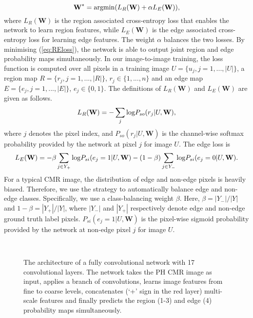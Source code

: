 \documentclass[runningheads,a4paper]{llncs}
\begin{document}
\begin{equation} \label{eq:REloss}
\textbf{W}^* = {\rm{argmin}} (L_R(\textbf{W}) + \alpha L_E(\textbf{W}) ),
\end{equation}
where $L_R(\textbf{W})$ is the region associated cross-entropy loss that enables the network to learn region features, while $L_E(\textbf{W})$ is the edge associated cross-entropy loss for learning edge features. The weight $\alpha$ balances the two losses. By minimising (\ref{eq:REloss}), the network is able to output joint region and edge probability maps simultaneously. In our image-to-image training, the loss function is computed over all pixels in a training image $U=\{u_j,j=1,...,|U|\}$, a region map $R=\{r_j,j=1,...,|R|\}$, $r_j \in \{1,...,n\}$ and an edge map $E=\{e_j,j=1,...,|E|\}$, $e_j \in \{0,1\}$. The definitions of $L_R(\textbf{W})$ and $L_E(\textbf{W})$ are given as follows.
\begin{equation} \label{eq:Rloss}
L_R(\textbf{W}) = -\sum\limits_{j}{\rm{log}}P_{so}(r_j|U,\textbf{W}),
\end{equation} 
where $j$ denotes the pixel index, and $P_{so}(r_j|U,\textbf{W})$ is the channel-wise softmax probability provided by the network at pixel $j$ for image $U$. The edge loss is 
\begin{equation} \label{eq:Eloss}
L_E(\textbf{W}) = -\beta\sum\limits_{j \in Y_+}{\rm{log}} P_{si}(e_j=1|U,\textbf{W}) - (1-\beta)\sum\limits_{j \in Y_-}{\rm{log}}P_{si}(e_j=0|U,\textbf{W}).
\end{equation}
For a typical CMR image, the distribution of edge and non-edge pixels is heavily biased. Therefore, we use the strategy  \cite{xie2015holistically} to automatically balance edge and non-edge classes. Specifically, we use a class-balancing weight $\beta$. Here, $\beta  =  |Y_ -|/|Y|$ and $1-\beta=|Y_ +|/|Y|$, where $|Y_-|$ and $|Y_+|$ respectively denote edge and non-edge ground truth label pixels. $P_{si}(e_j=1|U,\textbf{W})$ is the pixel-wise sigmoid probability provided by the network at non-edge pixel $j$ for image $U$. 

\begin{figure}[h!] 
\vspace{-10pt}
\\
\caption{The architecture of a fully convolutional network with 17 convolutional layers. The network takes the PH CMR image as input, applies a branch of convolutions, learns image features from fine to coarse levels, concatenates (`+' sign in the red layer) multi-scale features and finally predicts the region (1-3) and edge (4) probability maps simultaneously. }
\vspace{-10pt}
\label{fig:network}
\end{figure}
\end{document}
